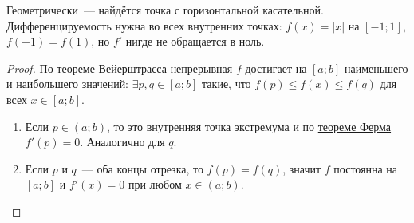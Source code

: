 

\begin{remark}
  Геометрически~--- найдётся точка с горизонтальной касательной. Дифференцируемость нужна во всех внутренних точках: $f(x) = |x|$ на $[-1;1]$, $f(-1) = f(1)$, но $f'$ нигде не обращается в ноль.
\end{remark}

\begin{proof}
  По \hyperref[note:82C70263-336A-49F5-82DB-9D25C84D6A6D]{теореме Вейерштрасса} непрерывная $f$ достигает на $[a;b]$ наименьшего и наибольшего значений: $\exists p, q \in [a;b]$ такие, что $f(p) \le f(x) \le f(q)$ для всех $x \in [a;b]$.

  \begin{enumerate}
    \item Если $p \in (a;b)$, то это внутренняя точка экстремума и по \hyperref[note:1E03F05F-22CC-4D55-BCF1-EBB5774765F0]{теореме Ферма} $f'(p) = 0$. Аналогично для $q$.
    \item Если $p$ и $q$~--- оба концы отрезка, то $f(p) = f(q)$, значит $f$ постоянна на $[a;b]$ и $f'(x) = 0$ при любом $x \in (a;b)$.
  \end{enumerate}
\end{proof}
